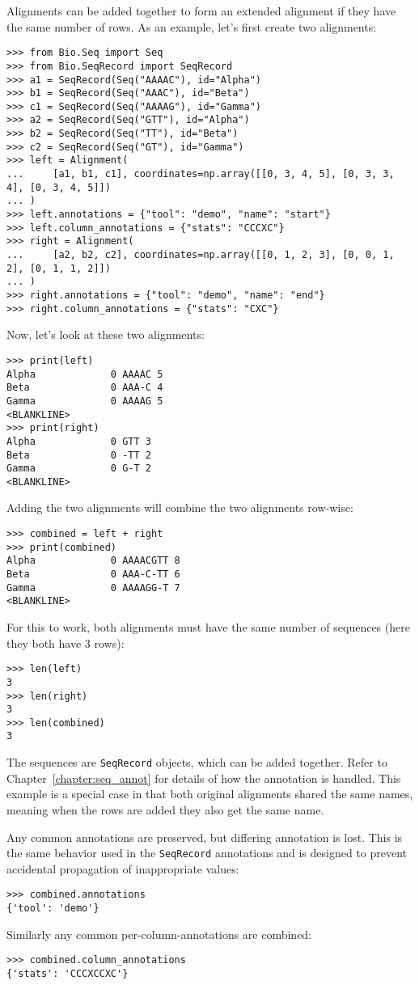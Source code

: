 Alignments can be added together to form an extended alignment if they have the same number of rows. As an example, let's first create two alignments:
\begin{verbatim}
>>> from Bio.Seq import Seq
>>> from Bio.SeqRecord import SeqRecord
>>> a1 = SeqRecord(Seq("AAAAC"), id="Alpha")
>>> b1 = SeqRecord(Seq("AAAC"), id="Beta")
>>> c1 = SeqRecord(Seq("AAAAG"), id="Gamma")
>>> a2 = SeqRecord(Seq("GTT"), id="Alpha")
>>> b2 = SeqRecord(Seq("TT"), id="Beta")
>>> c2 = SeqRecord(Seq("GT"), id="Gamma")
>>> left = Alignment(
...     [a1, b1, c1], coordinates=np.array([[0, 3, 4, 5], [0, 3, 3, 4], [0, 3, 4, 5]])
... )
>>> left.annotations = {"tool": "demo", "name": "start"}
>>> left.column_annotations = {"stats": "CCCXC"}
>>> right = Alignment(
...     [a2, b2, c2], coordinates=np.array([[0, 1, 2, 3], [0, 0, 1, 2], [0, 1, 1, 2]])
... )
>>> right.annotations = {"tool": "demo", "name": "end"}
>>> right.column_annotations = {"stats": "CXC"}
\end{verbatim}
Now, let's look at these two alignments:
\begin{verbatim}
>>> print(left)
Alpha             0 AAAAC 5
Beta              0 AAA-C 4
Gamma             0 AAAAG 5
<BLANKLINE>
>>> print(right)
Alpha             0 GTT 3
Beta              0 -TT 2
Gamma             0 G-T 2
<BLANKLINE>
\end{verbatim}
Adding the two alignments will combine the two alignments row-wise:
\begin{verbatim}
>>> combined = left + right
>>> print(combined)
Alpha             0 AAAACGTT 8
Beta              0 AAA-C-TT 6
Gamma             0 AAAAGG-T 7
<BLANKLINE>
\end{verbatim}
For this to work, both alignments must have the same number of sequences
(here they both have 3 rows):
\begin{verbatim}
>>> len(left)
3
>>> len(right)
3
>>> len(combined)
3
\end{verbatim}
The sequences are \verb|SeqRecord| objects, which can be added together. Refer
to Chapter~\ref{chapter:seq_annot} for details of how the annotation is handled.
This example is a special case in that both original alignments shared the same names, meaning when the rows are added they also get the same name.

Any common annotations are preserved, but differing annotation is lost. This is
the same behavior used in the \verb|SeqRecord| annotations and is designed to
prevent accidental propagation of inappropriate values:
\begin{verbatim}
>>> combined.annotations
{'tool': 'demo'}
\end{verbatim}
Similarly any common per-column-annotations are combined:
\begin{verbatim}
>>> combined.column_annotations
{'stats': 'CCCXCCXC'}
\end{verbatim}

